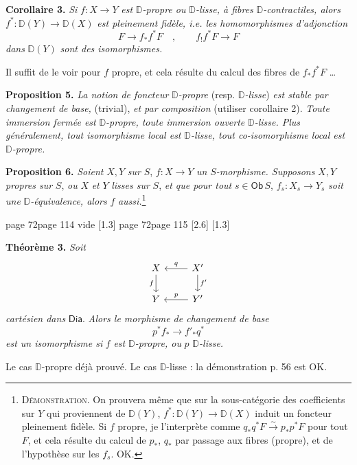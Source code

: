 \documentclass[11pt,leqno]{article}
\newcommand{\printedpage}[1]{\marginnote{\scriptsize\sffamily ed.\ #1}}
\newcommand{\msp}[1]{%
  \begingroup\def\thismsp{#1}\def\blankmsp{page 114 vide}%
  \ifx\thismsp\blankmsp
    \marginnote{\scriptsize\sffamily [114: vide]}[1.3\baselineskip]%
  \else\def\followingmsp{page 115}%
    \ifx\thismsp\followingmsp
      \marginnote{\scriptsize\sffamily [page 115]}[2.6\baselineskip]%
    \else\marginnote{\scriptsize\sffamily [#1]}[1.3\baselineskip]\fi
  \fi\endgroup}
\newcommand{\Dia}{\ensuremath{\mathsf{Dia}}}
\newcommand{\Ob}{\ensuremath{\mathsf{Ob}}}
\newcommand{\D}{\ensuremath{\mathbb{D}}}
\begin{document}
\noindent\textbf{Corollaire 3.} \textit{Si} $f : X \to Y$ \textit{est} $\D$\textit{-propre ou} $\D$\textit{-lisse, à fibres} $\D$\textit{-contractiles, alors} $f^* : \D(Y) \to \D(X)$ \textit{est pleinement fidèle, i.e. les homomorphismes d'adjonction}
\[
F \longrightarrow f_*f^*F \quad , \qquad f_!f^*F \longrightarrow F
\]
\textit{dans} $\D(Y)$ \textit{sont des isomorphismes.}

\noindent Il suffit de le voir pour $f$ propre, et cela résulte du calcul des fibres de $f_*f^*F$ \ldots

\noindent\textbf{Proposition 5.} \textit{La notion de foncteur} $\D$\textit{-propre} (resp. $\D$\textit{-lisse}) \textit{est stable par changement de base,} (trivial), \textit{et par composition} (utiliser corollaire 2). \textit{Toute immersion fermée est} $\D$\textit{-propre, toute immersion ouverte} $\D$\textit{-lisse. Plus généralement, tout isomorphisme local est} $\D$\textit{-lisse, tout co-isomorphisme local est} $\D$\textit{-propre.}

\noindent\textbf{Proposition 6.} \textit{Soient} $X, Y$ \textit{sur} $S$, $f : X \to Y$ \textit{un} $S$\textit{-morphisme. Supposons} $X, Y$ \textit{propres sur} $S$, \textit{ou} $X$ \textit{et} $Y$ \textit{lisses sur} $S$, \textit{et que pour tout} $s \in \Ob\, S$, $f_s : X_s \to Y_s$ \textit{soit une} $\D$\textit{-équivalence, alors} $f$ \textit{aussi.}\footnote[32]{\textsc{Démonstration}. On prouvera même que sur la sous-catégorie des coefficients sur $Y$ qui proviennent de $\D(Y)$, $f^* : \D(Y) \to \D(X)$ induit un foncteur pleinement fidèle. Si $f$ propre, je l'interprète comme $q_*q^*F \overset{\sim}{\to} p_*p^*F$ pour tout $F$, et cela résulte du calcul de $p_*$, $q_*$ par passage aux fibres (propre), et de l'hypothèse sur les $f_s$. OK.}

\msp{page 72}

\noindent\textbf{Théorème 3.} \textit{Soit}
\[
\begin{tikzcd}
X \arrow[d, "f"{swap}] & X' \arrow[l, "q"{swap}] \arrow[d, "f'"] \\
Y & Y' \arrow[l, "p"{swap}]
\end{tikzcd}
\]
\textit{cartésien dans} $\Dia$. \textit{Alors le morphisme de changement de base}
\[
p^*f_* \longrightarrow f'_*q^*
\]
\textit{est un isomorphisme si} $f$ \textit{est} $\D$\textit{-propre, ou} $p$ $\D$\textit{-lisse.}

\noindent Le cas $\D$-propre déjà prouvé. Le cas $\D$-lisse : la démonstration p. 56 est OK.

\printedpage{43}
\end{document}
